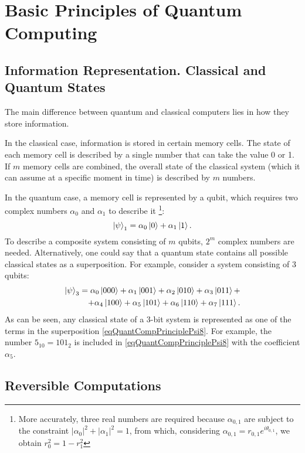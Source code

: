 \section{Basic Principles of Quantum Computing}

\subsection{Information Representation. Classical and Quantum States}
The main difference between quantum and classical computers lies in how they store information.

In the classical case, information is stored in certain memory cells. The state of each memory cell is described by a single number that can take the value 0 or 1. If $m$ memory cells are combined, the overall state of the classical system (which it can assume at a specific moment in time) is described by $m$ numbers.

In the quantum case, a memory cell is represented by a qubit, which requires two complex numbers $\alpha_0$ and $\alpha_1$ to describe it \footnote{More accurately, three real numbers are required because $\alpha_{0,1}$ are subject to the constraint $\left|\alpha_0\right|^2 + \left|\alpha_1\right|^2 = 1$, from which, considering $\alpha_{0,1} = r_{0,1}e^{i \theta_{0,1}}$, we obtain $r_0^2 = 1 - r_1^2$}:
\[
\left|\psi\right>_1 = \alpha_0 \ket{ 0 } + \alpha_1 \ket{ 1 }.
\]
To describe a composite system consisting of $m$ qubits, $2^m$ complex numbers are needed. Alternatively, one could say that a quantum state contains all possible classical states as a superposition. For example, consider a system consisting of 3 qubits:
\begin{eqnarray}
\left|\psi\right>_3 = 
\alpha_0 \ket{ 000 } + 
\alpha_1 \ket{ 001 } + 
\alpha_2 \ket{ 010 } + 
\alpha_3 \ket{ 011 } + 
\nonumber \\
+ 
\alpha_4 \ket{ 100 } + 
\alpha_5 \ket{ 101 } + 
\alpha_6 \ket{ 110 } + 
\alpha_7 \ket{ 111 }.
\label{eqQuantCompPrinciplePsi8}
\end{eqnarray}
As can be seen, any classical state of a 3-bit system is represented as one of the terms in the superposition \eqref{eqQuantCompPrinciplePsi8}. For example, the number $5_{10}=101_2$ is included in \eqref{eqQuantCompPrinciplePsi8} with the coefficient $\alpha_5$.

\subsection{Reversible Computations}


